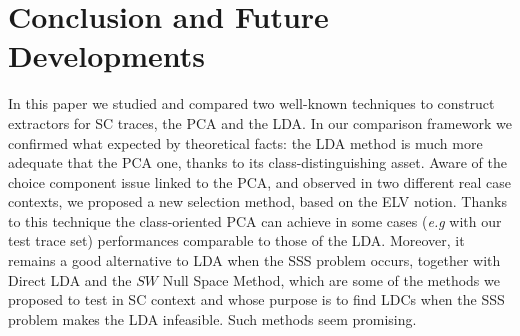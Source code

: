 \section{Conclusion and Future Developments}\label{sec:conclusions}

In this paper we studied and compared two well-known techniques to construct extractors for SC traces, the PCA and the LDA. In our comparison framework we confirmed what expected by theoretical facts: the LDA method is much more adequate that the PCA one, thanks to its class-distinguishing asset. Aware of the choice component issue linked to the PCA, and observed in two different real case contexts, we proposed a new selection method, based on the ELV notion. Thanks to this technique the class-oriented PCA can achieve in some cases ({\em e.g} with our test trace set) performances comparable to those of the LDA. Moreover, it remains a good alternative to LDA when the SSS problem occurs, together with Direct LDA and the $SW$ Null Space Method, which are some of the methods we proposed to test in SC context and whose purpose is to find LDCs when the SSS problem makes the LDA infeasible. Such methods seem promising.

